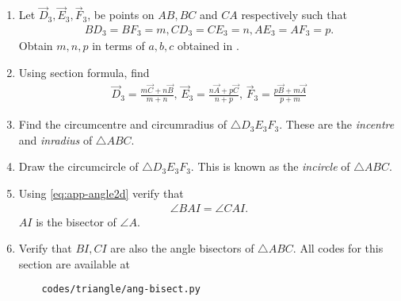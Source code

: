 \begin{enumerate}[label=\thesubsection.\arabic*.,ref=\thesubsection.\theenumi]
	\item Let $\vec{D}_3, \vec{E}_3, \vec{F}_3$, be points on $AB, BC$ and $CA$ respectively such that
		\begin{align}
			BD_3 = BF_3=m, CD_3 = CE_3=n, AE_3 = AF_3=p.
		\end{align}
	Obtain $m,n,p$ in terms of $a,b,c$ obtained in  
		.
 \\
 		
	\item Using section formula, find 
		\begin{align}
			\vec{D}_3 = \frac{m\vec{C}+n\vec{B}}{m+n},\,
			\vec{E}_3 = \frac{n\vec{A}+p\vec{C}}{n+p},\,
			\vec{F}_3 = \frac{p\vec{B}+m\vec{A}}{p+m}
		\end{align}
	\item Find the circumcentre and circumradius of $\triangle D_3E_3F_3$.  These are the {\em incentre} and {\em inradius} of $\triangle ABC$.
	\item Draw the circumcircle of $\triangle D_3E_3F_3$.  This is known as the {\em incircle} of $\triangle ABC$.
		\\
 		
	\item Using 
    \eqref{eq:app-angle2d}
verify that 
		\begin{align}
			\angle BAI = \angle CAI.
		\end{align}
		$AI$ is the bisector of $\angle A$.  
	\item Verify that $BI, CI$ are also the angle bisectors of $\triangle ABC$.
All codes for this section are available at
\begin{lstlisting}
	codes/triangle/ang-bisect.py
\end{lstlisting}

\end{enumerate}
